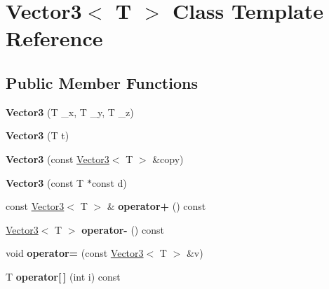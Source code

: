 \hypertarget{class_vector3}{}\section{Vector3$<$ T $>$ Class Template Reference}
\label{class_vector3}
\subsection*{Public Member Functions}
\begin{DoxyCompactItemize}
\item 
\mbox{\label{class_vector3_adb1fb5c16f9a7a4a4eece2157d08e948}} 
{\bfseries Vector3} (T \+\_\+x, T \+\_\+y, T \+\_\+z)
\item 
\mbox{\label{class_vector3_a4a7b696ecc1885b5582535aa20989fe9}} 
{\bfseries Vector3} (T t)
\item 
\mbox{\label{class_vector3_a485af798ead31cdba0703fea76802b6d}} 
{\bfseries Vector3} (const \mbox{\hyperlink{class_vector3}{Vector3}}$<$ T $>$ \&copy)
\item 
\mbox{\label{class_vector3_a94036caae80c9ca58b5a33290567464f}} 
{\bfseries Vector3} (const T $\ast$const d)
\item 
\mbox{\label{class_vector3_af33548c2732a3e9f7371cd72b5451509}} 
const \mbox{\hyperlink{class_vector3}{Vector3}}$<$ T $>$ \& {\bfseries operator+} () const
\item 
\mbox{\label{class_vector3_ac56aa56890581e5fd3f0087a3e93b326}} 
\mbox{\hyperlink{class_vector3}{Vector3}}$<$ T $>$ {\bfseries operator-\/} () const
\item 
\mbox{\label{class_vector3_a23dc7ac37e77f3f0e3b0ef627cace110}} 
void {\bfseries operator=} (const \mbox{\hyperlink{class_vector3}{Vector3}}$<$ T $>$ \&v)
\item 
\mbox{\label{class_vector3_a206c081d3b63b422de013f079b7c271e}} 
T {\bfseries operator\mbox{[}$\,$\mbox{]}} (int i) const
\item 
\mbox{\label{class_vector3_aac062f3795290b4bb1d2dc2a3a560c4c}} 

\end{DoxyCompactItemize}
